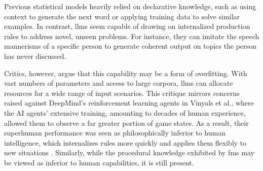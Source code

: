  \pskip

Previous statistical models heavily relied on declarative knowledge, such as using context to generate the next word or applying training data to solve similar examples. In contrast, \glspl{llm} seem capable of drawing on internalized production rules to address novel, unseen problems. For instance, they can imitate the speech mannerisms of a specific person to generate coherent output on topics the person has never discussed.

\pskip

Critics, however, argue that this capability may be a form of overfitting. With vast numbers of parameters and access to large corpora, \glspl{llm} can allocate resources for a wide range of input scenarios. This critique mirrors concerns raised against DeepMind's reinforcement learning agents in Vinyals et al., where the AI agents' extensive training, amounting to decades of human experience, allowed them to observe a far greater portion of game states. As a result, their superhuman performance was seen as philosophically inferior to human intelligence, which internalizes rules more quickly and applies them flexibly to new situations \cite{Vinyals2019}. Similarly, while the procedural knowledge exhibited by \glspl{fm} may be viewed as inferior to human capabilities, it is still present.